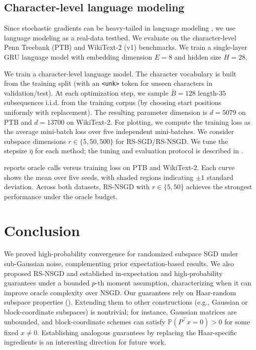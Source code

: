 \documentclass[10pt]{article}
\begin{document}
\subsection{Character-level language modeling}
\label{sec:exp-charlm}
Since stochastic gradients can be heavy-tailed in language modeling \citep{zhang2020clipped}, we use language modeling as a real-data testbed. We evaluate on the character-level Penn Treebank (PTB) \cite{marcus1993ptb} and WikiText-2 (v1) \cite{merity2017pointer} benchmarks.
We train a single-layer GRU language model \cite{cho2014gru} with embedding dimension $E=8$ and hidden size $H=28$.


We train a character-level language model. The character vocabulary is built from the training split (with an \texttt{<unk>} token for unseen characters in validation/test).
At each optimization step, we sample $\bar{B}=128$ length-$35$ subsequences i.i.d. from the training corpus (by choosing start positions uniformly with replacement).
The resulting parameter dimension is $d=5079$ on PTB and $d=13700$ on WikiText-2.
For plotting, we compute the training loss as the average mini-batch loss over five independent mini-batches.
We consider subspace dimensions $r\in\{5,50,500\}$ for RS-SGD/RS-NSGD.
We tune the stepsize $\bar{\eta}$ for each method; the tuning and evaluation protocol is described in .


 reports oracle calls versus training loss on PTB and WikiText-2.
Each curve shows the mean over five seeds, with shaded regions indicating $\pm 1$ standard deviation.
Across both datasets, RS-NSGD with $r\in\{5,50\}$ achieves the strongest performance under the oracle budget.

\section{Conclusion}
We proved high-probability convergence for randomized subspace SGD under sub-Gaussian noise, complementing prior expectation-based results. We also proposed RS-NSGD and established in-expectation and high-probability guarantees under a bounded $p$-th moment assumption, characterizing when it can improve oracle complexity over NSGD. Our guarantees rely on Haar-random subspace properties (). Extending them to other constructions (e.g., Gaussian or block-coordinate subspaces) is nontrivial; for instance, Gaussian matrices are unbounded, and block-coordinate schemes can satisfy $\mathbb{P}(P^\top x=0)>0$ for some fixed $x\neq 0$. Establishing analogous guarantees by replacing the Haar-specific ingredients is an interesting direction for future work.
\end{document}
